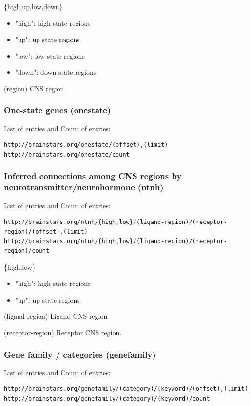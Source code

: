 \documentclass[12pt,fullpage]{article}
\begin{document}
\begin{description}
  \item{\{high,up,low,down\}}
    \begin{itemize}
      \item "high": high state regions
      \item "up": up state regions
      \item "low": low state regions
      \item "down": down state regions
    \end{itemize}
  \item{(region)} CNS region
\end{description}    

\subsubsection{One-state genes (onestate)}
List of entries and Count of entries: 
\begin{verbatim}
http://brainstars.org/onestate/(offset),(limit) 
http://brainstars.org/onestate/count
\end{verbatim}

\subsubsection{Inferred connections among CNS regions by neurotransmitter/neurohormone (ntnh)}
List of entries and Count of entries: 
\begin{verbatim}
http://brainstars.org/ntnh/{high,low}/(ligand-region)/(receptor-region)/(offset),(limit) 
http://brainstars.org/ntnh/{high,low}/(ligand-region)/(receptor-region)/count 
\end{verbatim}

\begin{description}
  \item{\{high,low\}}
    \begin{itemize}
      \item "high": high state regions
      \item "up": up state regions
    \end{itemize}        
  \item{(ligand-region)} Ligand CNS region
  \item{(receptor-region)} Receptor CNS region.
\end{description}

\subsubsection{Gene family / categories (genefamily)}
List of entries and Count of entries: 
\begin{verbatim}
http://brainstars.org/genefamily/(category)/(keyword)/(offset),(limit) 
http://brainstars.org/genefamily/(category)/(keyword)/count 
\end{verbatim}
\end{document}
